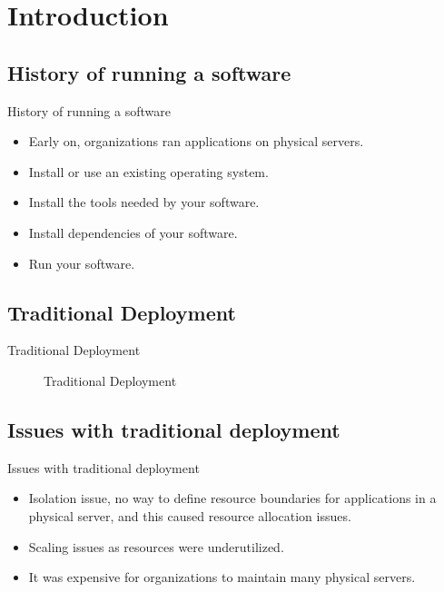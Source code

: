 
\section{Introduction}\label{sec:introduction}

\subsection{History of running a software}\label{subsec:history-of-running-a-software}
\begin{frame}{History of running a software}
    \begin{itemize}[<+- | alert@+>]
        \item Early on, organizations ran applications on physical servers.
        \item Install or use an existing operating system.
        \item Install the tools needed by your software.
        \item Install dependencies of your software.
        \item Run your software.
    \end{itemize}
\end{frame}

\subsection{Traditional Deployment}\label{subsec:traditional-deployment}
\begin{frame}{Traditional Deployment}
    \begin{figure}
        \raggedright
        
        \caption{Traditional Deployment}
    \end{figure}
\end{frame}

\subsection{Issues with traditional deployment}\label{subsec:issues-with-traditional-deployment}
\begin{frame}{Issues with traditional deployment}
    \begin{itemize}[<+- | alert@+>]
        \item Isolation issue, no way to define resource boundaries for applications in a physical server, and this caused resource allocation issues.
        \item Scaling issues as resources were underutilized.
        \item It was expensive for organizations to maintain many physical servers.
    \end{itemize}
\end{frame}
